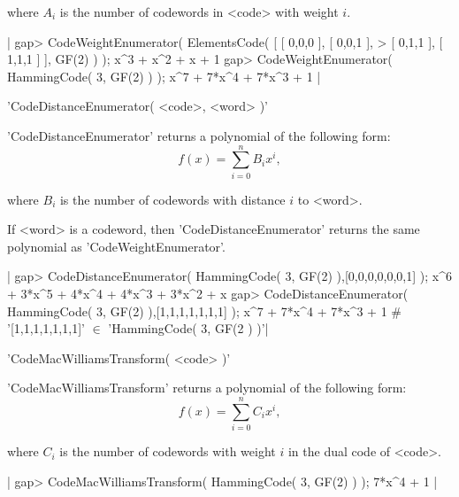 where $A_i$ is the number of codewords in <code> with weight $i$.

|    gap> CodeWeightEnumerator( ElementsCode( [ [ 0,0,0 ], [ 0,0,1 ],
    > [ 0,1,1 ], [ 1,1,1 ] ], GF(2) ) );
    x^3 + x^2 + x + 1
    gap> CodeWeightEnumerator( HammingCode( 3, GF(2) ) );
    x^7 + 7*x^4 + 7*x^3 + 1 |




'CodeDistanceEnumerator( <code>, <word> )'

'CodeDistanceEnumerator' returns a polynomial of the following form:
\begin{equation}
   f(x) = \sum_{i=0}^{n} B_i x^i,
\end{equation}

where $B_i$ is the number of codewords with distance $i$ to <word>.

If <word> is a codeword, then 'CodeDistanceEnumerator' returns the
same polynomial as 'CodeWeightEnumerator'.

|    gap> CodeDistanceEnumerator( HammingCode( 3, GF(2) ),[0,0,0,0,0,0,1] );
    x^6 + 3*x^5 + 4*x^4 + 4*x^3 + 3*x^2 + x
    gap> CodeDistanceEnumerator( HammingCode( 3, GF(2) ),[1,1,1,1,1,1,1] );
    x^7 + 7*x^4 + 7*x^3 + 1 # '[1,1,1,1,1,1,1]' $\in$ 'HammingCode( 3, GF(2 ) )'|




'CodeMacWilliamsTransform( <code> )'

'CodeMacWilliamsTransform' returns a polynomial of the following form:
\begin{equation}
   f(x) = \sum_{i=0}^{n} C_i x^i,
\end{equation}

where $C_i$ is the number of codewords with weight $i$ in the dual code
of <code>.

|    gap> CodeMacWilliamsTransform( HammingCode( 3, GF(2) ) );
    7*x^4 + 1 |



